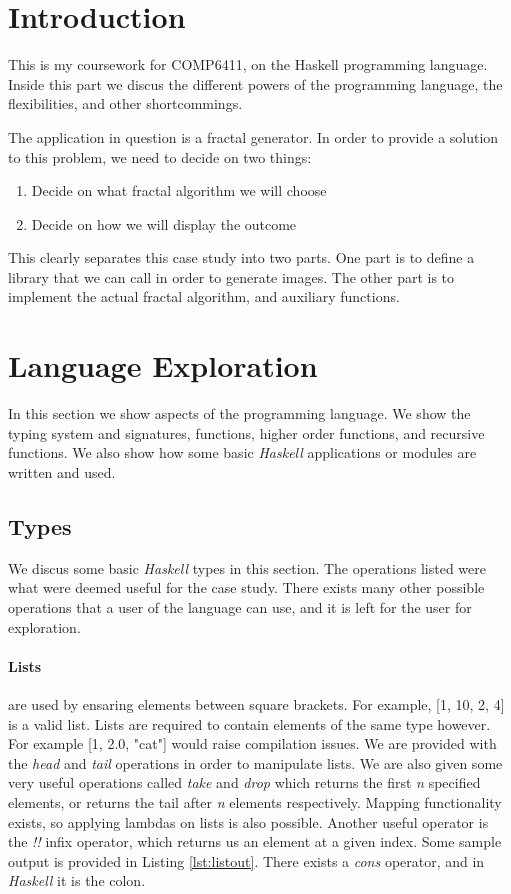 \section{Introduction}

This is my coursework for COMP6411, on the Haskell programming language. Inside
this part we discus the different powers of the programming language, the
flexibilities, and other shortcommings.  

The application in question is a fractal generator. In order to provide a
solution to this problem, we need to decide on two things:

\begin{enumerate}
\item Decide on what fractal algorithm we will choose
\item Decide on how we will display the outcome
\end{enumerate}

This clearly separates this case study into two parts. One part is to define
a library that we can call in order to generate images. The other part is to
implement the actual fractal algorithm, and auxiliary functions.

\section{Language Exploration}

In this section we show aspects of the programming language. We show the typing
system and signatures, functions, higher order functions, and recursive
functions. We also show how some basic \textit{Haskell} applications or modules
are written and used.

\subsection{Types}
We discus some basic \textit{Haskell} types in this section. The operations
listed were what were deemed useful for the case study. There exists many
other possible operations that a user of the language can use, and it is left
for the user for exploration.

\paragraph{Lists} are used by ensaring elements between square brackets. For
example, [1, 10, 2, 4] is a valid list. Lists are required to contain elements
of the same type however. For example [1, 2.0, "cat"] would raise compilation
issues. We are provided with the \textit{head} and \textit{tail} operations in 
order to manipulate lists. We are also given some very useful operations called
\textit{take} and \textit{drop} which returns the first \textit{n} specified 
elements, or returns the tail after \textit{n} elements respectively. Mapping
functionality exists, so applying lambdas on lists is also possible. Another
useful operator is the \textit{!!} infix operator, which returns us an element
at a given index. Some sample output is provided in Listing \ref{lst:listout}.
There exists a \textit{cons} operator, and in \textit{Haskell} it is the colon.

